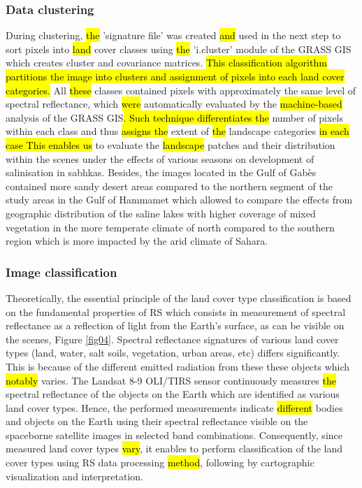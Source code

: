 \documentclass[land,article,submit,pdftex,moreauthors]{Definitions/mdpi}
\begin{document}
\subsubsection{Data clustering}

During clustering, \hl{the} 'signature file' was created \hl{and} used in the next step to sort pixels into \hl{land} cover classes using \hl{the }'i.cluster' module of the GRASS GIS which creates cluster and covariance matrices. \hl{This classification algorithm partitions the image into clusters and assignment of pixels into each land cover categories. }All \hl{these }classes contained pixels with approximately the same level of spectral reflectance, which \hl{were} automatically evaluated by the \hl{machine-based} analysis of the GRASS GIS\hl{. Such technique differentiates the} number of pixels within each class and thus \hl{assigns the} extent of \hl{the }landscape categories \hl{in each case This enables us} to evaluate the \hl{landscape }patches and their distribution within the scenes under the effects of various seasons on development of salinisation in sabhkas. Besides, the images located in the Gulf of Gabès contained more sandy desert areas compared to the northern segment of the study areas in the Gulf of Hammamet which allowed to compare the effects from geographic distribution of the saline lakes with higher coverage of mixed vegetation in the more temperate climate of north compared to the southern region which is more impacted by the arid climate of Sahara.

\subsubsection{Image classification}

Theoretically, the essential  principle of the land cover type classification is based on the fundamental properties of RS which consists in measurement of spectral reflectance as a reflection of light from the Earth's surface, as can be visible on the scenes, Figure \ref{fig04}. Spectral reflectance signatures of various land cover types (land, water, salt soils, vegetation, urban areas, etc) differs significantly. This is because of the different emitted radiation from these these objects which \hl{notably} varies. The Landsat 8-9 OLI/TIRS sensor continuously measures \hl{the }spectral reflectance of the objects on the Earth which are identified as various land cover types. Hence, the performed measurements indicate \hl{different} bodies and objects on the Earth using their spectral reflectance visible on the spaceborne satellite images in selected band combinations. Consequently, since measured land cover types \hl{vary}, it enables to perform classification of the land cover types using RS data processing \hl{method}, following by cartographic visualization and interpretation. 
\end{document}
